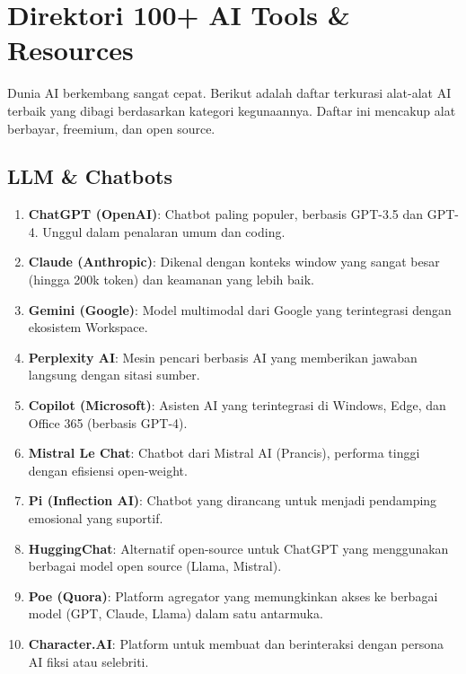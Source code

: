 \chapter{Direktori 100+ AI Tools \& Resources}
\label{chap:tools}

Dunia AI berkembang sangat cepat. Berikut adalah daftar terkurasi alat-alat AI terbaik yang dibagi berdasarkan kategori kegunaannya. Daftar ini mencakup alat berbayar, freemium, dan open source.

\section{LLM \& Chatbots}
\begin{enumerate}
    \item \textbf{ChatGPT (OpenAI)}: Chatbot paling populer, berbasis GPT-3.5 dan GPT-4. Unggul dalam penalaran umum dan coding.
    \item \textbf{Claude (Anthropic)}: Dikenal dengan konteks window yang sangat besar (hingga 200k token) dan keamanan yang lebih baik.
    \item \textbf{Gemini (Google)}: Model multimodal dari Google yang terintegrasi dengan ekosistem Workspace.
    \item \textbf{Perplexity AI}: Mesin pencari berbasis AI yang memberikan jawaban langsung dengan sitasi sumber.
    \item \textbf{Copilot (Microsoft)}: Asisten AI yang terintegrasi di Windows, Edge, dan Office 365 (berbasis GPT-4).
    \item \textbf{Mistral Le Chat}: Chatbot dari Mistral AI (Prancis), performa tinggi dengan efisiensi open-weight.
    \item \textbf{Pi (Inflection AI)}: Chatbot yang dirancang untuk menjadi pendamping emosional yang suportif.
    \item \textbf{HuggingChat}: Alternatif open-source untuk ChatGPT yang menggunakan berbagai model open source (Llama, Mistral).
    \item \textbf{Poe (Quora)}: Platform agregator yang memungkinkan akses ke berbagai model (GPT, Claude, Llama) dalam satu antarmuka.
    \item \textbf{Character.AI}: Platform untuk membuat dan berinteraksi dengan persona AI fiksi atau selebriti.
\end{enumerate}

